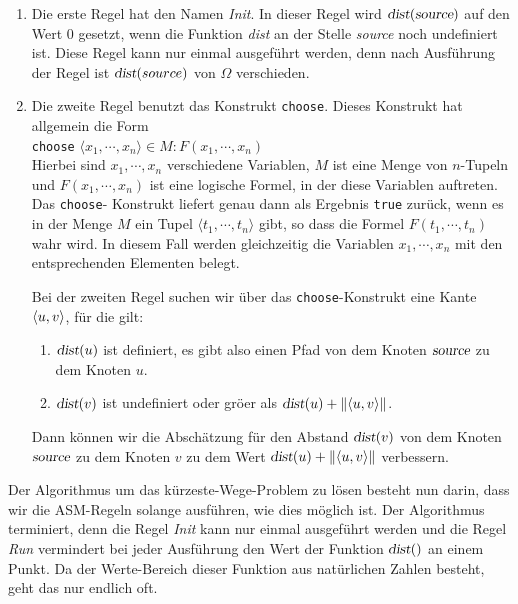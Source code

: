 \begin{enumerate}
\item Die erste Regel hat den Namen \textsl{Init}.
      In dieser Regel wird  $\textsl{dist}(\textsl{source})$ auf den Wert 0
      gesetzt, wenn die Funktion \textsl{dist} an der Stelle \textsl{source}
      noch undefiniert ist.  Diese Regel kann nur einmal ausgef\"uhrt werden,
      denn nach Ausf\"uhrung der Regel ist $\textsl{dist}(source)$ von $\Omega$ verschieden.
\item Die zweite Regel benutzt das Konstrukt \texttt{choose}.
      Dieses Konstrukt hat allgemein die Form 
      \\[0.2cm]
      \hspace*{1.3cm}
      \texttt{choose} $\langle x_1, \cdots, x_n\rangle \in M: F(x_1,\cdots,x_n)$
      \\[0.2cm]
      Hierbei sind $x_1, \cdots, x_n$ verschiedene Variablen, $M$ ist eine Menge von
      $n$-Tupeln und \linebreak 
      $F(x_1,\cdots,x_n)$ ist eine
      logische Formel, in der diese Variablen auftreten.
      Das \texttt{choose}-\linebreak
      Konstrukt liefert genau dann als Ergebnis \texttt{true}
      zur\"uck, wenn es in der Menge $M$ ein Tupel $\langle t_1,\cdots,t_n\rangle$ gibt, so dass die Formel 
      $F(t_1,\cdots,t_n)$ wahr wird.  In diesem Fall werden gleichzeitig die Variablen
      $x_1,\cdots,x_n$ mit den entsprechenden Elementen belegt.
      
      Bei der zweiten Regel suchen wir \"uber das \texttt{choose}-Konstrukt
      eine Kante $\pair(u,v)$, f\"ur die gilt: 
      \begin{enumerate}
      \item $\textsl{dist}(u)$ ist definiert, es gibt also einen Pfad von
            dem Knoten $\textsl{source}$  zu dem Knoten $u$.
      \item $\textsl{dist}(v)$ ist undefiniert oder gr\"o\3er als 
            $\textsl{dist}(u)+\|\langle{}u,v\rangle\|$. 
      \end{enumerate}
      Dann k\"onnen wir die Absch\"atzung
      f\"ur den Abstand $\textsl{dist}(v)$ von dem Knoten $\textsl{source}$ zu dem Knoten
      $v$ zu dem Wert $\textsl{dist}(u)+\|\langle{}u,v\rangle\|$ verbessern.
\end{enumerate}
Der Algorithmus um das k\"urzeste-Wege-Problem zu l\"osen besteht nun darin,
dass wir die ASM-Regeln solange ausf\"uhren, wie dies m\"oglich ist. 
Der Algorithmus terminiert, denn die Regel \textsl{Init} kann nur einmal ausgef\"uhrt
werden und die Regel \textsl{Run} vermindert bei jeder Ausf\"uhrung den Wert
der Funktion $\textsl{dist}()$ an einem Punkt.  Da der Werte-Bereich dieser Funktion aus
nat\"urlichen Zahlen besteht, geht das nur endlich oft.


